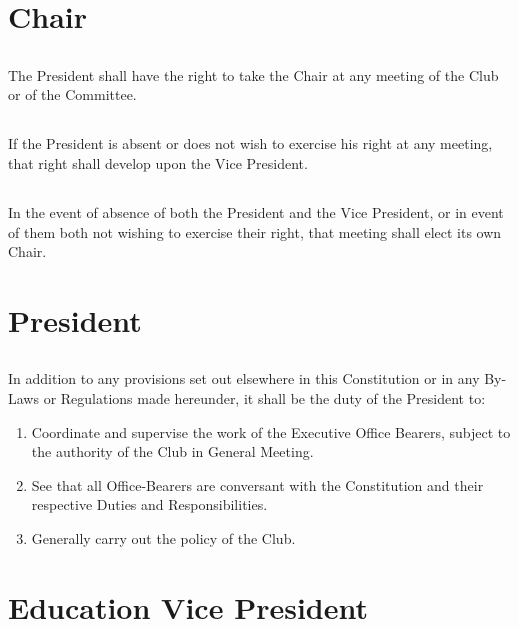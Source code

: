 \documentclass[10.5pt]{article}
\begin{document}
\section{Chair}
\subsection{} The President shall have the right to take the Chair at any meeting of the Club or of the
Committee.
\subsection{} If the President is absent or does not wish to exercise his right at any meeting, that right
shall develop upon the Vice President.
\subsection{} In the event of absence of both the President and the Vice President, or in event of them both not wishing to exercise their right, that meeting shall elect its own Chair.
\newline 


\section{President}
\subsection{} In addition to any provisions set out elsewhere in this Constitution or in any By-Laws or Regulations made hereunder, it shall be the duty of the President to: 
\begin{enumerate}[label=(\alph*)]
    \item Coordinate and supervise the work of the Executive Office Bearers, subject to the authority of the Club in General Meeting. 
    \item See that all Office-Bearers are conversant with the Constitution and their respective Duties and Responsibilities. 
    \item Generally carry out the policy of the Club. 
    \newline
\end{enumerate}


\section{Education Vice President}
\end{document}

